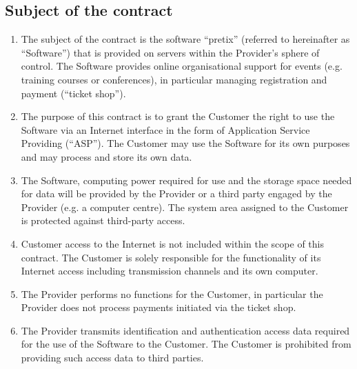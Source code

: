 \documentclass{terms}
\begin{document}
\subsection{Subject of the contract}
\begin{enumerate}
\item The subject of the contract is the software “pretix” (referred to hereinafter as “Software”) that is provided on servers within the Provider's sphere of control. The Software provides online organisational support for events (e.g. training courses or conferences), in particular managing registration and payment (“ticket shop”).
\item The purpose of this contract is to grant the Customer the right to use the Software via an Internet interface in the form of Application Service Providing (“ASP”). The Customer may use the Software for its own purposes and may process and store its own data.
\item The Software, computing power required for use and the storage space needed for data will be provided by the Provider or a third party engaged by the Provider (e.g. a computer centre). The system area assigned to the Customer is protected against third-party access.
\item Customer access to the Internet is not included within the scope of this contract. The Customer is solely responsible for the functionality of its Internet access including transmission channels and its own computer.
\item The Provider performs no functions for the Customer, in particular the Provider does not process payments initiated via the ticket shop.
\item The Provider transmits identification and authentication access data required for the use of the Software to the Customer. The Customer is prohibited from providing such access data to third parties.
\end{enumerate}
\end{document}
